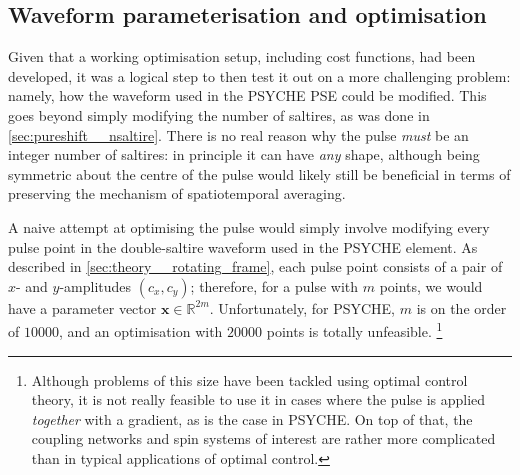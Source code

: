\subsection{Waveform parameterisation and optimisation}
\label{subsec:pureshift__chirpopt}

Given that a working optimisation setup, including cost functions, had been developed, it was a logical step to then test it out on a more challenging problem: namely, how the waveform used in the PSYCHE PSE could be modified.
This goes beyond simply modifying the number of saltires, as was done in \cref{sec:pureshift__nsaltire}.
There is no real reason why the pulse \textit{must} be an integer number of saltires: in principle it can have \textit{any} shape, although being symmetric about the centre of the pulse would likely still be beneficial in terms of preserving the mechanism of spatiotemporal averaging.

A naive attempt at optimising the pulse would simply involve modifying every pulse point in the double-saltire waveform used in the PSYCHE element.
As described in \cref{sec:theory__rotating_frame}, each pulse point consists of a pair of $x$- and $y$-amplitudes $(c_x, c_y)$; therefore, for a pulse with $m$ points, we would have a parameter vector $\symbf{x} \in \mathbb{R}^{2m}$.
Unfortunately, for PSYCHE, $m$ is on the order of $10000$, and an optimisation with $20000$ points is totally unfeasible.%
\footnote{Although problems of this size have been tackled using optimal control theory\autocite{Khaneja2005JMR,deFouquieres2011JMR,Glaser2015EPJD,Goodwin2016JCP}, it is not really feasible to use it in cases where the pulse is applied \textit{together} with a gradient, as is the case in PSYCHE. On top of that, the coupling networks and spin systems of interest are rather more complicated than in typical applications of optimal control.}

